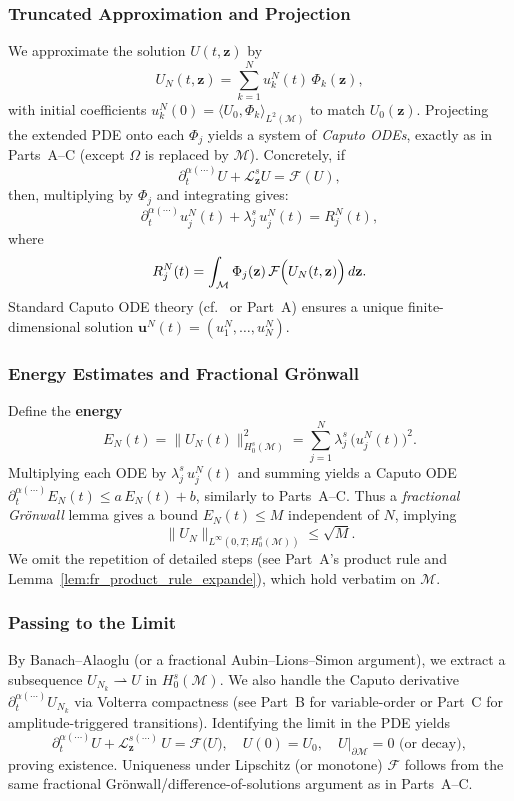 \documentclass[12pt]{article}
\begin{document}
\subsubsection{Truncated Approximation and Projection}

We approximate the solution \(U(t,\mathbf{z})\) by 
\[
U_N(t,\mathbf{z})
=
\sum_{k=1}^N u_k^N(t)\,\Phi_k(\mathbf{z}),
\]
with initial coefficients $u_k^N(0)=\langle U_0,\Phi_k\rangle_{L^2(\mathcal{M})}$ to match 
\(U_0(\mathbf{z})\). Projecting the extended PDE onto each $\Phi_j$ yields a system of 
\emph{Caputo ODEs}, exactly as in Parts~A--C (except $\Omega$ is replaced by $\mathcal{M}$). 
Concretely, if 
\[
\partial_t^{\alpha(\cdots)} U + \mathcal{L}_{\mathbf{z}}^s U = \mathcal{F}(U),
\]
then, multiplying by $\Phi_j$ and integrating gives:
\[
\partial_t^{\alpha(\cdots)} u_j^N(t)
+ \lambda_j^s\,u_j^N(t)
=
R_j^N(t),
\]
where
\[
R_j^N(t)
= 
\int_{\mathcal{M}} \Phi_j(\mathbf{z})\, \mathcal{F}\Bigl(U_N(t,\mathbf{z})\Bigr)\,d\mathbf{z}.
\]
Standard Caputo ODE theory (cf.\ \cite[Ch.~2]{Diethelm2010} or Part~A) ensures a unique 
finite-dimensional solution $\mathbf{u}^N(t)=(u_1^N,\dots,u_N^N)$.

\subsubsection{Energy Estimates and Fractional Gr\"onwall}

Define the \textbf{energy} 
\[
E_N(t)
=
\|U_N(t)\|_{H_0^s(\mathcal{M})}^2
=
\sum_{j=1}^N \lambda_j^s \,\bigl(u_j^N(t)\bigr)^2.
\]
Multiplying each ODE by $\lambda_j^s\,u_j^N(t)$ and summing yields a Caputo ODE 
$\partial_t^{\alpha(\cdots)}E_N(t)\leq a\,E_N(t)+b$, similarly to Parts~A--C. Thus a 
\emph{fractional Grönwall} lemma gives a bound $E_N(t)\le M$ independent of $N$, implying 
\[
\|U_N\|_{L^\infty(0,T;H_0^s(\mathcal{M}))} \le \sqrt{M}.
\]
We omit the repetition of detailed steps (see Part~A’s product rule and Lemma~\ref{lem:fr_product_rule_expande}), 
which hold verbatim on $\mathcal{M}$.

\subsubsection{Passing to the Limit}

By Banach–Alaoglu (or a fractional Aubin--Lions–Simon argument), we extract a subsequence 
$U_{N_k}\rightharpoonup U$ in $H_0^s(\mathcal{M})$. We also handle the Caputo derivative 
$\partial_t^{\alpha(\cdots)}U_{N_k}$ via Volterra compactness (see Part~B for variable-order 
or Part~C for amplitude-triggered transitions). Identifying the limit in the PDE yields
\[
\partial_t^{\alpha(\cdots)}U
+ \mathcal{L}_{\mathbf{z}}^{s(\cdots)}\,U
=
\mathcal{F}\bigl(U\bigr),
\quad
U(0)=U_0,
\quad
U\big|_{\partial\mathcal{M}}=0 \text{ (or decay)},
\]
proving existence. Uniqueness under Lipschitz (or monotone) $\mathcal{F}$ follows from 
the same fractional Grönwall/difference-of-solutions argument as in Parts~A--C.
\end{document}
